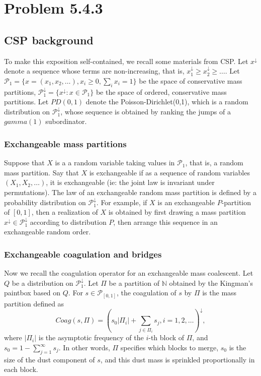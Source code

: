 \section{Problem 5.4.3} 


\subsection{CSP background}
To make this exposition self-contained, we recall some materials from CSP. 
Let $x^\downarrow$ denote a sequence whose terms are non-increasing, that is, $x^\downarrow_1 \geq x^\downarrow_2 \geq \ldots$. Let $\mathcal{P}_1 = \{x = (x_1, x_2, \ldots), x_i \geq 0, \sum_ix_i = 1\}$ be the space of conservative mass partitions, $\mathcal{P}_1^\downarrow = \{x^\downarrow: x \in \mathcal{P}_1\}$ be the space of ordered, conservative mass partitions. Let $PD(0,1)$ denote the Poisson-Dirichlet(0,1), which is a random distribution on $\mathcal{P}^\downarrow_1$, whose sequence is obtained by ranking the jumps of a $gamma(1)$ subordinator.

\subsubsection{Exchangeable mass partitions}

Suppose that $X$ is a a random variable taking values in $\mathcal{P}_1$, that is, a random mass partition. Say that $X$ is exchangeable if as a sequence of random variables $(X_1, X_2, \ldots)$, it is exchangeable (ie: the joint law is invariant under permutations). The law of an exchangeable random mass partition is defined by a probability distribution on $\mathcal{P}_1^\downarrow$. For example, if $X$ is an exchangeable $P$-partition of $[0,1]$, then a realization of $X$ is obtained by first drawing a mass partition $x^\downarrow \in \mathcal{P}_1^\downarrow$ according to distribution $P$, then arrange this sequence in an exchangeable random order. 

\subsubsection{Exchangeable coagulation and bridges}
Now we recall the coagulation operator for an exchangeable mass coalescent. Let $Q$ be a distribution on $\mathcal{P}^\downarrow_1$. Let $\Pi$ be a partition of $\mathbb{N}$ obtained by the Kingman's paintbox based on $Q$. For $s \in \mathcal{P}_{[0,1]}$, the coagulation of $s$ by $\Pi$ is the mass partition defined as
\begin{equation}\label{eqn:coag}
Coag(s,\Pi) = (s_0|\Pi_i| + \sum_{j \in \Pi_i}s_j, i = 1,2,\ldots)^\downarrow, 
\end{equation}
where $|\Pi_i|$ is the asymptotic frequency of the $i$-th block of $\Pi$, and $s_0 = 1-\sum_{j=1}^\infty s_j$. In other words, $\Pi$ specifies which blocks to merge, $s_0$ is the size of the dust component of $s$, and this dust mass is sprinkled proportionally in each block. 

